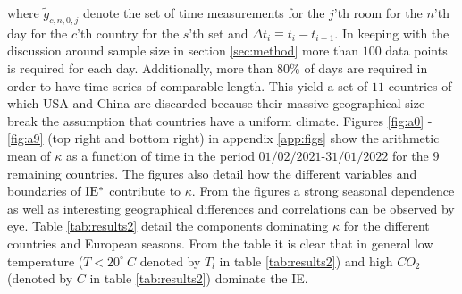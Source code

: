 \documentclass[fleqn,usenatbib,nofootinbib]{revtex4-2}
\begin{document}
	where $\tilde{g}_{c,n,0,j}$ denote the set of time measurements for the $j$'th room for the $n$'th day for the $c$'th country for the $s$'th set and $\Delta t_{i}\equiv t_{i}-t_{i-1}$.	In keeping with the discussion around sample size in section \ref{sec:method} more than $100$ data points is required for each day. Additionally, more than $80\%$ of days are required in order to have time series of comparable length. This yield a set of $11$ countries of which USA and China are discarded because their massive geographical size break the assumption that countries have a uniform climate. Figures \ref{fig:a0} -\ref{fig:a9} (top right and bottom right) in appendix \ref{app:figs} show the arithmetic mean of $\kappa$ as a function of time in the period $01/02/2021$-$31/01/2022$ for the $9$ remaining countries. The figures also detail how the different variables and boundaries of $\rm IE^*$ contribute to $\kappa$. From the figures a strong seasonal dependence as well as interesting geographical differences and correlations can be observed by eye. Table \ref{tab:results2} detail the components dominating $\kappa$ for the different countries and European seasons. From the table it is clear that in general low temperature ($T< 20^\circ \ C$ denoted by $T_l$ in table \ref{tab:results2}) and high $CO_2$ (denoted by $C$ in table \ref{tab:results2}) dominate the IE.
	
\end{document}
